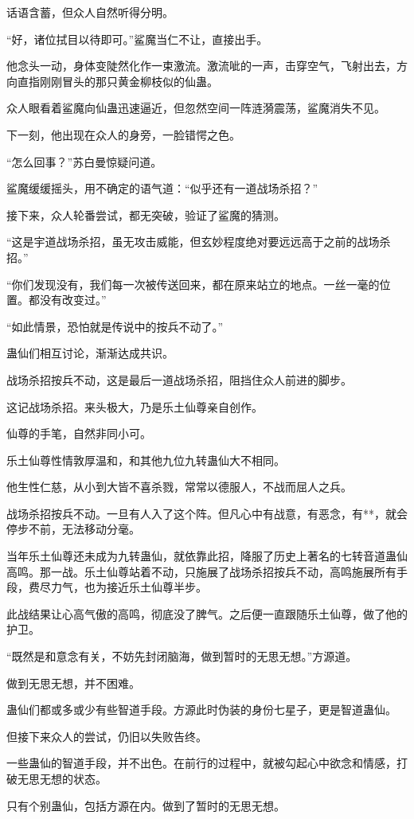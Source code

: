 \begin{this_body}
话语含蓄，但众人自然听得分明。

“好，诸位拭目以待即可。”鲨魔当仁不让，直接出手。

他念头一动，身体变陡然化作一束激流。激流呲的一声，击穿空气，飞射出去，方向直指刚刚冒头的那只黄金柳枝似的仙蛊。

众人眼看着鲨魔向仙蛊迅速逼近，但忽然空间一阵涟漪震荡，鲨魔消失不见。

下一刻，他出现在众人的身旁，一脸错愕之色。

“怎么回事？”苏白曼惊疑问道。

鲨魔缓缓摇头，用不确定的语气道：“似乎还有一道战场杀招？”

接下来，众人轮番尝试，都无突破，验证了鲨魔的猜测。

“这是宇道战场杀招，虽无攻击威能，但玄妙程度绝对要远远高于之前的战场杀招。”

“你们发现没有，我们每一次被传送回来，都在原来站立的地点。一丝一毫的位置。都没有改变过。”

“如此情景，恐怕就是传说中的按兵不动了。”

蛊仙们相互讨论，渐渐达成共识。

战场杀招按兵不动，这是最后一道战场杀招，阻挡住众人前进的脚步。

这记战场杀招。来头极大，乃是乐土仙尊亲自创作。

仙尊的手笔，自然非同小可。

乐土仙尊性情敦厚温和，和其他九位九转蛊仙大不相同。

他生性仁慈，从小到大皆不喜杀戮，常常以德服人，不战而屈人之兵。

战场杀招按兵不动。一旦有人入了这个阵。但凡心中有战意，有恶念，有**，就会停步不前，无法移动分毫。

当年乐土仙尊还未成为九转蛊仙，就依靠此招，降服了历史上著名的七转音道蛊仙高鸣。那一战。乐土仙尊站着不动，只施展了战场杀招按兵不动，高鸣施展所有手段，费尽力气，也为接近乐土仙尊半步。

此战结果让心高气傲的高鸣，彻底没了脾气。之后便一直跟随乐土仙尊，做了他的护卫。

“既然是和意念有关，不妨先封闭脑海，做到暂时的无思无想。”方源道。

做到无思无想，并不困难。

蛊仙们都或多或少有些智道手段。方源此时伪装的身份七星子，更是智道蛊仙。

但接下来众人的尝试，仍旧以失败告终。

一些蛊仙的智道手段，并不出色。在前行的过程中，就被勾起心中欲念和情感，打破无思无想的状态。

只有个别蛊仙，包括方源在内。做到了暂时的无思无想。


\end{this_body}
